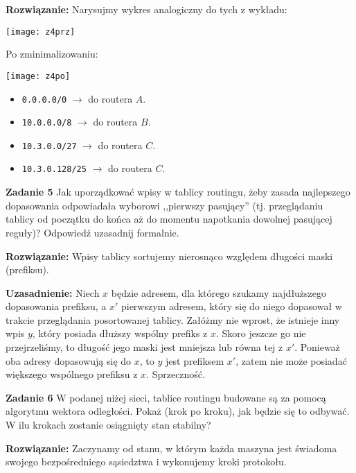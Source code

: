 \documentclass[12pt,a4paper]{article}
\begin{document}
\vskip 0.2cm

\noindent
\textbf{Rozwiązanie:} Narysujmy wykres analogiczny do tych z wykładu:

\begin{center}
	\texttt{[image: z4prz]}	
\end{center}

Po zminimalizowaniu:

\begin{center}
	\texttt{[image: z4po]}	
\end{center}

\begin{itemize}
	\item \texttt{0.0.0.0/0} \(\rightarrow\) do routera \(A\).
	\item \texttt{10.0.0.0/8} \(\rightarrow\) do routera \(B\).
	\item \texttt{10.3.0.0/27} \(\rightarrow\) do routera \(C\).
	\item \texttt{10.3.0.128/25} \(\rightarrow\) do routera \(C\).
\end{itemize}

\vskip 0.2cm
\noindent
\textbf{Zadanie 5} Jak uporządkować wpisy w tablicy routingu, żeby zasada najlepszego dopasowania odpowiadała wyborowi ,,pierwszy pasujący'' (tj. przeglądaniu tablicy od początku do końca aż do momentu napotkania dowolnej pasującej reguły)? Odpowiedź uzasadnij formalnie.
\vskip 0.2cm

\noindent
\textbf{Rozwiązanie:} Wpisy tablicy sortujemy nierosnąco względem długości maski (prefiksu).
\vskip 0.2cm

\noindent
\textbf{Uzasadnienie:} Niech \(x\) będzie adresem, dla którego szukamy najdłuższego dopasowania prefiksu, a \(x'\) pierwszym adresem, który się do niego dopasował w trakcie przeglądania posortowanej tablicy. Załóżmy nie wprost, że istnieje inny wpis \(y\), który posiada dłuższy wspólny prefiks z \(x\). Skoro jeszcze go nie przejrzeliśmy, to długość jego maski jest mniejsza lub równa tej z \(x'\). Ponieważ oba adresy dopasowują się do \(x\), to \(y\) jest prefiksem \(x'\), zatem nie może posiadać większego wspólnego prefiksu z \(x\). Sprzeczność.

\vskip 0.2cm
\noindent
\textbf{Zadanie 6} W podanej niżej sieci, tablice routingu budowane są za pomocą algorytmu wektora odległości. Pokaż (krok po kroku), jak będzie się to odbywać. W ilu krokach zostanie osiągnięty stan stabilny?
\vskip 0.2cm

\noindent
\textbf{Rozwiązanie:} Zaczynamy od stanu, w którym każda maszyna jest świadoma swojego bezpośredniego sąsiedztwa i wykonujemy kroki protokołu.
\end{document}
